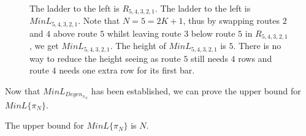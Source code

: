 \begin{center}
\begin{figure}[!htp]
\begin{minipage}{.4\textwidth}
\begin{tikzpicture}
    
                \end{tikzpicture}
            \end{minipage}
            \caption{The ladder to the left is $R_{5,4,3,2,1}$. The ladder to the left is $MinL_{5,4,3,2,1}$. Note that $N=5=2K+1$, thus 
            by swapping routes $2$ and $4$ above route $5$ whilst leaving route $3$ below route $5$ in $R_{5,4,3,2,1}$, we get 
            $MinL_{5,4,3,2,1}$. The height of $MinL_{5,4,3,2,1}$ is $5$. There is no way to reduce the height seeing as route $5$ still needs 
            $4$ rows and route $4$ needs one extra row for its first bar.}
            \label{Fig:RootToMinLadder}
        \end{figure}   

   \end{center}
   Now that $MinL_{Degen_{\pi_{N}}}$ has been established, we can prove the upper bound for
   $MinL\{\pi_{N}\}$. 
   \begin{lemma}
       The upper bound for $MinL\{\pi_{N}\}$ is $N$.
   \end{lemma}
